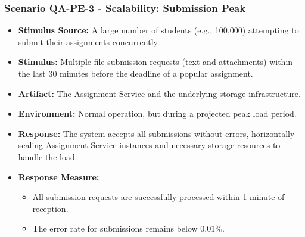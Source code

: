 \subsubsection{Scenario QA-PE-3 - Scalability: Submission Peak}
\begin{itemize}
    \item \textbf{Stimulus Source:} A large number of students (e.g., 100,000) attempting to submit their assignments concurrently.
    \item \textbf{Stimulus:} Multiple file submission requests (text and attachments) within the last 30 minutes before the deadline of a popular assignment.
    \item \textbf{Artifact:} The Assignment Service and the underlying storage infrastructure.
    \item \textbf{Environment:} Normal operation, but during a projected peak load period.
    \item \textbf{Response:} The system accepts all submissions without errors, horizontally scaling Assignment Service instances and necessary storage resources to handle the load.
    \item \textbf{Response Measure:}
    \begin{itemize}
        \item All submission requests are successfully processed within 1 minute of reception.
        \item The error rate for submissions remains below $0.01\%$.
    \end{itemize}
\end{itemize}

\clearpage

